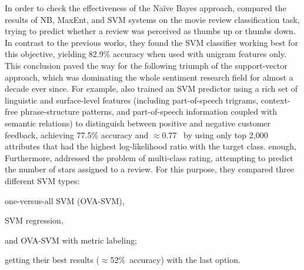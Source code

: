 
In order to check the effectiveness of the Na{\"i}ve Bayes approach,
\citet{Pang:02} compared the results of NB, MaxEnt, and SVM systems on
the movie review classification task, trying to predict whether a
review was perceived as thumbs up or thumbs down.  In contrast to the
previous works, they found the SVM classifier working best for this
objective, yielding 82.9\% accuracy when used with unigram features
only.  This conclusion paved the way for the following triumph of the
support-vector approach, which was dominating the whole sentiment
research field for almost a decade ever since.  For example,
\citet{Gamon:04} also trained an SVM predictor using a rich set of
linguistic and surface-level features (including part-of-speech
trigrams, context-free phrase-structure patterns, and part-of-speech
information coupled with semantic relations) to distinguish between
positive and negative customer feedback, achieving 77.5\% accuracy and
$\approx$0.77~\F{} by using only top 2,000 attributes that had the
highest log-likelihood ratio with the target class.  %
enough,
Furthermore, \citet{Pang:05} addressed the problem of multi-class
rating, attempting to predict the number of stars assigned to a
review.  For this purpose, they compared three different SVM types:
\begin{inparaenum}[(i)]
\item one-versus-all SVM (OVA-SVM),
\item SVM regression,
\item and OVA-SVM with metric labeling;
\end{inparaenum}
getting their best results ($\approx$52\%~accuracy) with the last
option.
